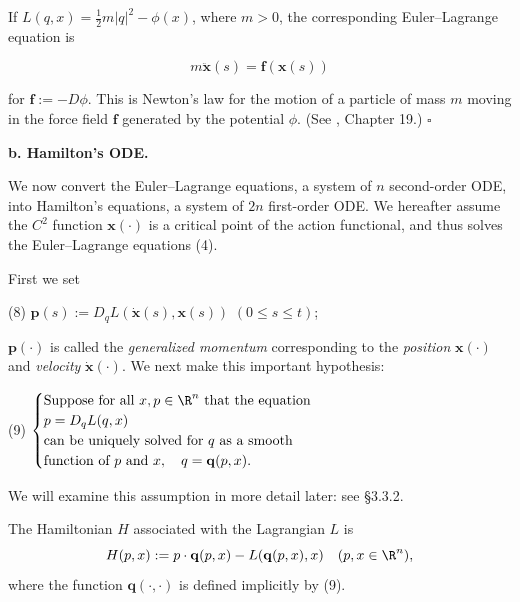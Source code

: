 \begin{example}
\label{ex:newtons-law-lagrangian}
If $L(q,x) = \frac{1}{2}m|q|^2 - \phi(x)$, where $m > 0$, the corresponding Euler--Lagrange equation is

$$m\ddot{\mathbf{x}}(s) = \mathbf{f}(\mathbf{x}(s))$$

for $\mathbf{f} := -D\phi$. This is Newton's law for the motion of a particle of mass $m$ moving in the force field $\mathbf{f}$ generated by the potential $\phi$. (See \cite{FeynmanLeightonSands1966}, Chapter 19.) $\square$
\end{example}

\textbf{b. Hamilton's ODE.}

We now convert the Euler--Lagrange equations, a system of $n$ second-order ODE, into Hamilton's equations, a system of $2n$ first-order ODE. We hereafter assume the $C^2$ function $\mathbf{x}(\cdot)$ is a critical point of the action functional, and thus solves the Euler--Lagrange equations (4).

First we set

(8) \quad $\mathbf{p}(s) := D_q L(\dot{\mathbf{x}}(s), \mathbf{x}(s))$ \quad $(0 \le s \le t)$;

$\mathbf{p}(\cdot)$ is called the \textit{generalized momentum} corresponding to the \textit{position} $\mathbf{x}(\cdot)$ and \textit{velocity} $\dot{\mathbf{x}}(\cdot)$. We next make this important hypothesis:

(9) \quad $\begin{cases}
\text{Suppose for all } x, p \in \R^n \text{ that the equation}\\
p = D_q L(q, x)\\
\text{can be uniquely solved for } q \text{ as a smooth}\\
\text{function of } p \text{ and } x, \quad q = \mathbf{q}(p, x).
\end{cases}$

We will examine this assumption in more detail later: see \S 3.3.2.

\begin{definition}
\label{def:hamiltonian-from-lagrangian}
The Hamiltonian $H$ associated with the Lagrangian $L$ is
$$H(p, x) := p \cdot \mathbf{q}(p, x) - L(\mathbf{q}(p, x), x) \quad (p, x \in \R^n),$$
where the function $\mathbf{q}(\cdot, \cdot)$ is defined implicitly by (9).
\end{definition}

